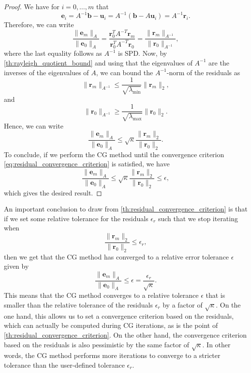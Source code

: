 \begin{proof}
  We have for $i=0,\dots,m$ that
  \[
    \mathbf{e}_i = A^{-1}\mathbf{b} - \mathbf{u}_i = A^{-1}(\mathbf{b} - A\mathbf{u}_i) = A^{-1}\mathbf{r}_i.
  \]
  Therefore, we can write
  \[
    \frac{\|\mathbf{e}_m\|_A}{\|\mathbf{e}_0\|_A} = \frac{\mathbf{r}_0^TA^{-T}\mathbf{r}_m}{\mathbf{r}_0^TA^{-T}\mathbf{r}_0} = \frac{\|\mathbf{r}_m\|_{A^{-1}}}{\|\mathbf{r}_0\|_{A^{-1}}},
  \]
  where the last equality follows as $A^{-1}$ is SPD. Now, by \cref{th:rayleigh_quotient_bound} and using that the eigenvalues of $A^{-1}$ are the inverses of the eigenvalues of $A$, we can bound the $A^{-1}$-norm of the residuals as
  \[
    \|\mathbf{r}_m\|_{A^{-1}}  \leq \frac{1}{\sqrt{\lambda_{\text{min}}}} \|\mathbf{r}_m\|_2,
  \]
  and
  \[
    \|\mathbf{r}_0\|_{A^{-1}} \geq \frac{1}{\sqrt{\lambda_{\text{max}}}} \|\mathbf{r}_0\|_2.
  \]
  Hence, we can write
  \[
    \frac{\|\mathbf{e}_m\|_A}{\|\mathbf{e}_0\|_A} \leq \sqrt{\kappa} \frac{\|\mathbf{r}_m\|_2}{\|\mathbf{r}_0\|_2}.
  \]
  To conclude, if we perform the CG method until the convergence criterion \cref{eq:residual_convergence_criterion} is satisfied, we have
  \[
    \frac{\|\mathbf{e}_m\|_A}{\|\mathbf{e}_0\|_A} \leq \sqrt{\kappa} \frac{\|\mathbf{r}_m\|_2}{\|\mathbf{r}_0\|_2} \leq \epsilon,
  \]
  which gives the desired result.
\end{proof}
An important conclusion to draw from \cref{th:residual_convergence_criterion} is that if we set some relative tolerance for the residuals $\epsilon_r$ such that we stop iterating when
\begin{equation}
  \frac{\|\mathbf{r}_m\|_2}{\|\mathbf{r}_0\|_2} \leq \epsilon_r,
  \label{eq:residual_convergence_criterion_r}
\end{equation}
then we get that the CG method has converged to a relative error tolerance $\epsilon$ given by
\[
  \frac{\|\mathbf{e}_m\|_A}{\|\mathbf{e}_0\|_A} \leq \epsilon = \frac{\epsilon_r}{\sqrt{\kappa}}.
\]
This means that the CG method converges to a relative tolerance $\epsilon$ that is smaller than the relative tolerance of the residuals $\epsilon_r$ by a factor of $\sqrt{\kappa}$. On the one hand, this allows us to set a convergence criterion based on the residuals, which can actually be computed during CG iterations, as is the point of \cref{th:residual_convergence_criterion}. On the other hand, the convergence criterion based on the residuals is also pessimistic by the same factor of $\sqrt{\kappa}$. In other words, the CG method performs more iterations to converge to a stricter tolerance than the user-defined tolerance $\epsilon_r$.

